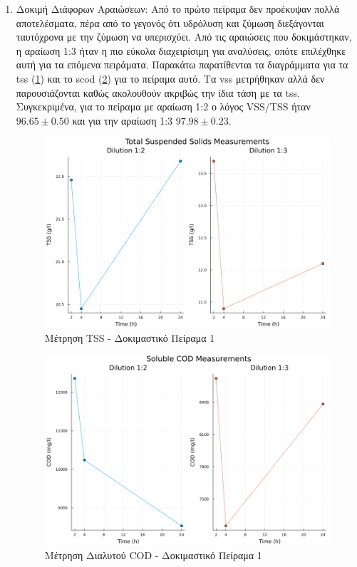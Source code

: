 \documentclass[11pt]{report}
\begin{document}
\begin{enumerate}
\item Δοκιμή Διάφορων Αραιώσεων:
\label{sec:org4244506}
Από το πρώτο πείραμα δεν προέκυψαν πολλά αποτελέσματα, πέρα από το γεγονός ότι υδρόλυση και ζύμωση διεξάγονται ταυτόχρονα με την ζύμωση να υπερισχύει. Από τις αραιώσεις που δοκιμάστηκαν, η αραίωση 1:3 ήταν η πιο εύκολα διαχειρίσιμη για αναλύσεις, οπότε επιλέχθηκε αυτή για τα επόμενα πειράματα. Παρακάτω παρατίθενται τα διαγράμματα για τα \acrfull{tss} (\ref{fig:orgc4db377}) και το \acrfull{scod} (\ref{fig:org1caed91}) για το πείραμα αυτό. Τα \acrfull{vss} μετρήθηκαν αλλά δεν παρουσιάζονται καθώς ακολουθούν ακριβώς την ίδια τάση με τα \acrfull{tss}. Συγκεκριμένα, για το πείραμα με αραίωση 1:2 ο λόγος VSS/TSS ήταν \(96.65 \pm 0.50\) και για την αραίωση 1:3 \(97.98 \pm 0.23\). 

\begin{figure}[htbp]
\centering
\includegraphics[width=.9\linewidth]{../plots/10_10/tss_plot.png}
\caption{\label{fig:orgc4db377}Μέτρηση TSS - Δοκιμαστικό Πείραμα 1}
\end{figure}

\begin{figure}[htbp]
\centering
\includegraphics[width=.9\linewidth]{../plots/10_10/COD_plot.png}
\caption{\label{fig:org1caed91}Μέτρηση Διαλυτού COD - Δοκιμαστικό Πείραμα 1}
\end{figure}


\end{enumerate}
\end{document}
